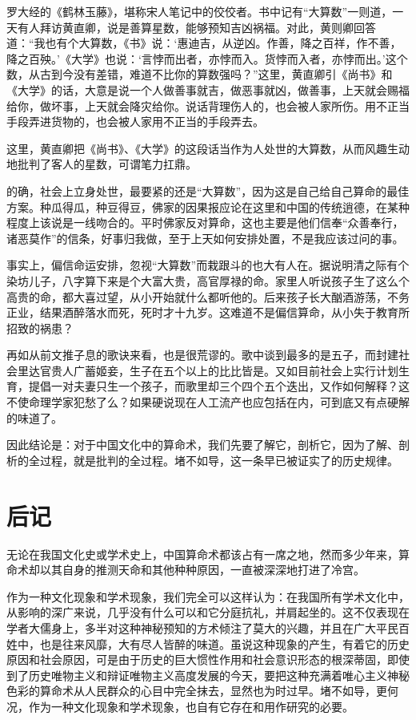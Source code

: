 \documentclass[a5paper,oneside,12pt]{ctexbook}
\begin{document}
{{罗大经的《鹤林玉藤》，堪称宋人笔记中的佼佼者。书中记有“大算数”一则道，一天有人拜访黄直卿，说是善算星数，能够预知吉凶祸福。对此，黄则卿回答道：“我也有个大算数，《书》说：‘惠迪吉，从逆凶。作善，降之百祥，作不善，降之百殃。’《大学》也说：‘言悖而出者，亦悖而入。货悖而入者，亦悖而出。’这个数，从古到今没有差错，难道不比你的算数强吗？”这里，黄直卿引《尚书》和《大学》的话，大意是说一个人做善事就吉，做恶事就凶，做善事，上天就会赐福给你，做坏事，上天就会降灾给你。说话背理伤人的，也会被人家所伤。用不正当手段弄进货物的，也会被人家用不正当的手段弄去。

这里，黄直卿把《尚书》、《大学》的这段话当作为人处世的大算数，从而风趣生动地批判了客人的星数，可谓笔力扛鼎。

的确，社会上立身处世，最要紧的还是“大算数”，因为这是自己给自己算命的最佳方案。种瓜得瓜，种豆得豆，佛家的因果报应论在这里和中国的传统逍德，在某种程度上该说是一线吻合的。平时佛家反对算命，这也主要是他们信奉“众善奉行，诸恶莫作”的信条，好事归我做，至于上天如何安排处置，不是我应该过问的事。

事实上，偏信命运安排，忽视“大算数”而栽跟斗的也大有人在。据说明清之际有个染坊儿子，八字算下来是个大富大贵，高官厚禄的命。家里人听说孩子生了这么个高贵的命，都大喜过望，从小开始就什么都听他的。后来孩子长大酗酒游荡，不务正业，结果酒醉落水而死，死时才十九岁。这难道不是偏信算命，从小失于教育所招致的祸患？

再如从前文推子息的歌诀来看，也是很荒谬的。歌中谈到最多的是五子，而封建社会里达官贵人广蓄姬妾，生子在五个以上的比比皆是。又如目前社会上实行计划生育，提倡一对夫妻只生一个孩子，而歌里却三个四个五个迭出，又作如何解释？这不使命理学家犯愁了么？如果硬说现在人工流产也应包括在内，可到底又有点硬解的味道了。

因此结论是：对于中国文化中的算命术，我们先要了解它，剖析它，因为了解、剖析的全过程，就是批判的全过程。堵不如导，这一条早已被证实了的历史规律。



\chapter{后记}

无论在我国文化史或学术史上，中国算命术都该占有一席之地，然而多少年来，算命术却以其自身的推测天命和其他种种原因，一直被深深地打进了冷宫。

作为一种文化现象和学术现象，我们完全可以这样认为：在我国所有学术文化中，从影响的深广来说，几乎没有什么可以和它分庭抗礼，并肩起坐的。这不仅表现在学者大儒身上，多半对这种神秘预知的方术倾注了莫大的兴趣，并且在广大平民百姓中，也是往来风靡，大有尽人皆醉的味道。虽说这种现象的产生，有着它的历史原因和社会原因，可是由于历史的巨大惯性作用和社会意识形态的根深蒂固，即使到了历史唯物主义和辩证唯物主义高度发展的今天，要把这种充满着唯心主义神秘色彩的算命术从人民群众的心目中完全抹去，显然也为时过早。堵不如导，更何况，作为一种文化现象和学术现象，也自有它存在和用作研究的必要。

}}
\end{document}
